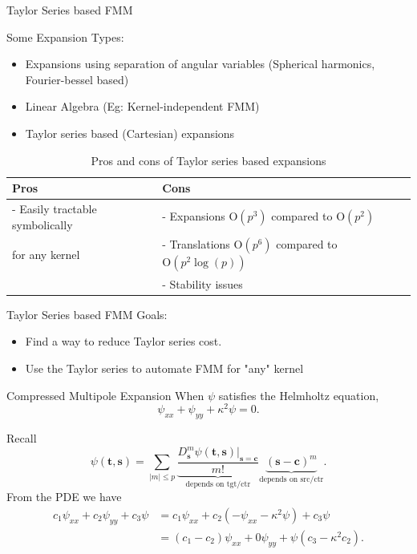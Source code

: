 \documentclass[10pt,usenames,dvipsnames]{beamer}
\def\b#1{\mathbf{ #1}}
\begin{document}
\begin{frame}[fragile]{Taylor Series based FMM}

 Some Expansion Types:
 \begin{itemize}
     \item Expansions using separation of angular variables (Spherical harmonics, Fourier-bessel based)
     \item Linear Algebra (Eg: Kernel-independent FMM)
     \item Taylor series based (Cartesian) expansions
 \end{itemize}

\renewcommand{\arraystretch}{2}

 \begin{table}[]
 \scriptsize
 \begin{tabular}{l|l}
     Pros & Cons \\ \hline
     - Easily tractable symbolically & - Expansions $\mathrm{O}(p^3)$ compared to $\mathrm{O}(p^2)$ \\
     \hspace{1 mm} for any kernel & - Translations $\mathrm{O}(p^6)$ compared to $\mathrm{O}(p^2\log(p))$ \\
    & - Stability issues \\
 \end{tabular}
     \caption{Pros and cons of Taylor series based expansions}
 \end{table}

\end{frame}
\begin{frame}[fragile]{Taylor Series based FMM}
  Goals:
    \begin{itemize}
        \item Find a way to reduce Taylor series cost.
        \item Use the Taylor series to automate FMM for "any" kernel
    \end{itemize}
\end{frame}

\begin{frame}[fragile]{Compressed Multipole Expansion}
 When $\psi$ satisfies the Helmholtz equation,
 \[
  \psi_{x x} + \psi_{y y} + \kappa^2 \psi = 0.
 \]

 Recall
 \[
 \psi(\b t, \b s) = \sum_{|m| \le p} \underbrace{\frac{D_{\b s}^m \psi(\b t, \b s)\Bigr|_{\b s = \b c}}{m!}}_{\text{depends on tgt/ctr}} \underbrace{(\b s - \b c)^m}_{\text{depends on src/ctr}}.
 \]
 From the PDE we have
 \begin{align*}
  c_1 \psi_{x x} +  c_2 \psi_{y y} + c_3 \psi 
  &= c_1 \psi_{x x} +  c_2 (-\psi_{x x} - \kappa^2 \psi) + c_3 \psi \\
  &= (c_1 - c_2) \psi_{x x} + 0 \psi_{y y} +\psi (c_3 - \kappa^2 c_2).
 \end{align*}
\end{frame}
\end{document}
